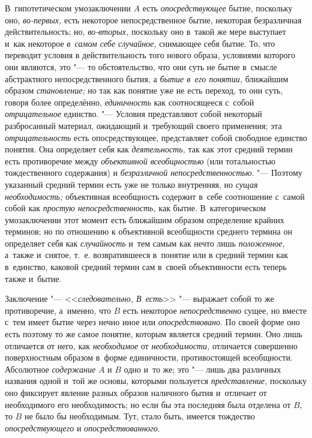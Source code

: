 В~гипотетическом умозаключении $A$ есть
{\em опосредствующее} бытие, поскольку оно, {\em во-первых,} есть
некоторое непосредственное бытие, некоторая безразличная действительность;
но, {\em во-вторых,} поскольку оно в~такой же мере выступает и~как некоторое
{\em в~самом себе случайное,}
снимающее себя бытие. То, что переводит условия в
действительность того нового образа, условиями которого они являются, это
"--- то обстоятельство, что они суть не бытие в~смысле
абстрактного непосредственного бытия, а
{\em бытие в~его понятии,} ближайшим образом {\em становление;} но так
как понятие уже не есть переход, то они суть, говоря более определённо,
{\em единичность} как
соотносящееся с~собой {\em отрицательное} единство. "--- Условия
представляют собой некоторый разбросанный материал,
ожидающий и~требующий своего применения; эта {\em отрицательность}
есть опосредствующее, представляет собой свободное единство
понятия. Она определяет себя как {\em деятельность,} так
как этот средний термин есть противоречие между
{\em объективной всеобщностью}
(или тотальностью тождественного содержания) и
{\em безразличной непосредственностью}.
"--- Поэтому указанный средний термин есть уже не только
внутренняя, но {\em сущая необходимость;} объективная всеобщность содержит
в~себе соотношение с~самой собой как {\em простую непосредственность,}
как бытие. В~категорическом умозаключении этот момент есть
ближайшим образом определение крайних терминов; но по отношению к
объективной всеобщности среднего термина он определяет себя как
{\em случайность} и~тем самым как нечто лишь {\em положенное,}
а~также и~снятое, т.~е. возвратившееся в~понятие или в
средний термин как в~единство, каковой средний термин сам в~своей
объективности есть теперь также и~бытие.

Заключение "--- <<{\em следовательно, В~есть}>>
"--- выражает собой то же противоречие, а~именно, что
$B$ есть некоторое {\em непосредственно}
сущее, но вместе с~тем имеет бытие через нечно иное или
{\em опосредствовано}.
По своей форме оно есть поэтому то же самое понятие, которым
является средний термин. Оно лишь отличается от него, как
{\em необходимое} от {\em необходимости,}
отличается совершенно поверхностным образом в~форме
единичности, противостоящей всеобщности. Абсолютное
{\em содержание} $A$ и $B$ одно и~то же;
это "--- лишь два различных названия одной и~той же основы,
которыми пользуется {\em представление,}
поскольку оно фиксирует явление разных образов наличного
бытия и~отличает от необходимого его необходимость; но если бы эта
последняя была отделена от $B$, то $B$ не было бы необходимым.
Тут, стало быть, имеется тождество {\em опосредствующего} и
{\em опосредствованного}.

